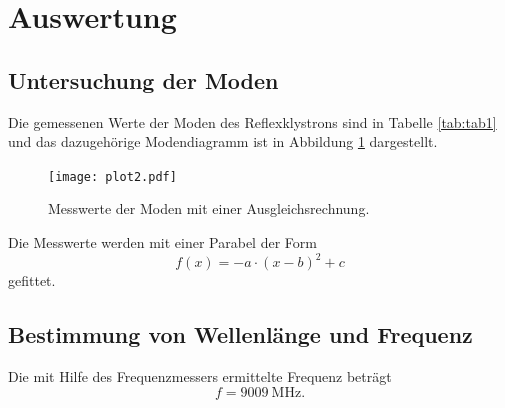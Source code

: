 \section{Auswertung}
\label{sec:Auswertung}
\subsection{Untersuchung der Moden}

Die gemessenen Werte der Moden des Reflexklystrons sind in Tabelle \ref{tab:tab1} und das
dazugehörige Modendiagramm ist in Abbildung \ref{fig:Mode} dargestellt.

\begin{figure}[H]
  \centering
  \texttt{[image: plot2.pdf]}
  \caption{Messwerte der Moden mit einer Ausgleichsrechnung.}
  \label{fig:Mode}
\end{figure}
Die Messwerte werden mit einer Parabel der Form
\begin{equation}
  f(x)=-a\cdot(x-b)^2 +c
\end{equation}
gefittet.

\subsection{Bestimmung von Wellenlänge und Frequenz}

Die mit Hilfe des Frequenzmessers ermittelte Frequenz beträgt
\begin{equation}
  f=\SI{9009}{\MHz}.
\end{equation}

